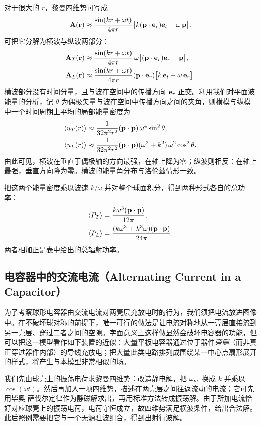 对于很大的 $r$，黎曼四维势可写成
\begin{equation}
\mathbf{A}(\mathbf{r}) \approx \frac{\sin(kr+\omega t)}{4\pi r}\bigl[k(\mathbf{p}\cdot\mathbf{e}_{r})\mathbf{e}_{t}-\omega\,\mathbf{p}\bigr].
\end{equation}
可把它分解为横波与纵波两部分：
\begin{align}
\mathbf{A}_{T}(\mathbf{r}) &\approx \frac{\sin(kr+\omega t)}{4\pi r}\,\omega\bigl[(\mathbf{p}\cdot\mathbf{e}_{r})\mathbf{e}_{r}-\mathbf{p}\bigr],\\
\mathbf{A}_{L}(\mathbf{r}) &\approx \frac{\sin(kr+\omega t)}{4\pi r}(\mathbf{p}\cdot\mathbf{e}_{r})\bigl[k\,\mathbf{e}_{t}-\omega\,\mathbf{e}_{r}\bigr].
\end{align}
横波部分没有时间分量，且与波在空间中的传播方向 $\mathbf{e}_{r}$ 正交。利用我们对平面波能量的分析，记 $\theta$ 为偶极矢量与波在空间中传播方向之间的夹角，则横模与纵模中一个时间周期上平均的局部能量密度为
\begin{align}
\langle u_{T}(r)\rangle &\approx \frac{1}{32\pi^{2}r^{2}}(\mathbf{p}\cdot\mathbf{p})\,\omega^{4}\sin^{2}\theta,\\
\langle u_{L}(r)\rangle &\approx \frac{1}{32\pi^{2}r^{2}}(\mathbf{p}\cdot\mathbf{p})(\omega^{2}+k^{2})\,\omega^{2}\cos^{2}\theta.
\end{align}
由此可见，横波在垂直于偶极轴的方向最强，在轴上降为零；纵波则相反：在轴上最强，垂直方向降为零。横波的能量角分布与洛伦兹情形一致。

把这两个能量密度乘以波速 $k/\omega$ 并对整个球面积分，得到两种形式各自的总功率：
\begin{align}
\langle P_{T}\rangle &= \frac{k\omega^{3}(\mathbf{p}\cdot\mathbf{p})}{12\pi},\\
\langle P_{L}\rangle &= \frac{(k\omega^{3}+k^{3}\omega)(\mathbf{p}\cdot\mathbf{p})}{24\pi}.
\end{align}
两者相加正是表中给出的总辐射功率。

\subsection{电容器中的交流电流（Alternating Current in a Capacitor）}

为了考察球形电容器由交流电流对两壳层充放电时的行为，我们须把电流放进图像中。在不破坏球对称的前提下，唯一可行的做法是让电流对称地从一壳层直接流到另一壳层、穿过二者之间的空隙。字面意义上这样做显然会破坏电容器的功能，但可以把这一模型看作如下装置的近似：大量平板电容器通过位于器件\emph{旁侧}（而非真正穿过器件内部）的导线充放电；把大量此类电路排列成围绕某一中心点扇形展开的样式，将产生与本模型非常相似的场。

我们先由球壳上的振荡电荷求黎曼四维势：改造静电解，把 $\omega_m$ 换成 $k$ 并乘以 $\cos(\omega t)$。然后再加入一项四维势，描述在两壳层之间往返流动的电流；它可先用毕奥-萨伐尔定律作为静磁解求出，再用标准方法转成振荡解。由于所加电流恰好对应球壳上的振荡电荷，电荷守恒成立，故四维势满足横波条件，给出合法解。此后照例需要把它与一个无源驻波组合，得到出射行波解。

